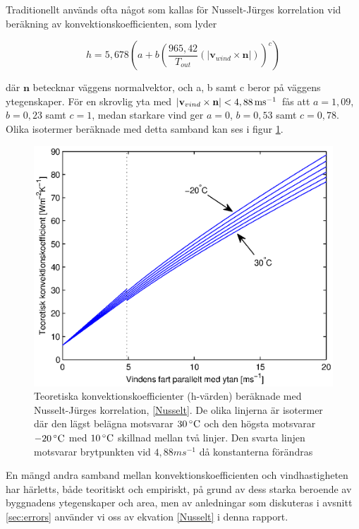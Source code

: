 Traditionellt används ofta något som kallas för Nusselt-Jürges korrelation vid beräkning av konvektionskoefficienten, som lyder

\begin{equation}\label{Nusselt}
h = 5,678 \left( a + b \left( \frac{965,42}{T_{out}}\left(|\mathbf{v}_{wind}\times \mathbf{n}|\right) \right)^c \right)
\end{equation}

där $\mathbf{n}$ betecknar väggens normalvektor, och a, b samt c beror på väggens ytegenskaper. För en skrovlig yta med $|\mathbf{v}_{vind}\times \mathbf{n}| < \unit[4,88]{ms^{-1}}$ fås att $a=1,09$, $b=0,23$ samt $c=1$, medan starkare vind ger $a=0$, $b=0,53$ samt $c=0,78$. Olika isotermer beräknade med detta samband kan ses i figur \ref{hvalues}.

\begin{figure}[hpbt]\centering
\includegraphics[scale=0.7]{images/hvalues.eps}
\caption{Teoretiska konvektionskoefficienter (h-värden) beräknade med Nusselt-Jürges korrelation, \eqref{Nusselt}. De olika linjerna är isotermer där den lägst belägna motsvarar $\unit[30]{^{\circ}C}$ och den högsta motsvarar $\unit[-20]{^{\circ}C}$ med $\unit[10]{^{\circ}C}$ skillnad mellan två linjer. Den svarta linjen motsvarar brytpunkten vid $\unit{4,88}{m s^{-1}}$ då konstanterna förändras}
\label{hvalues}
\end{figure}

En mängd andra samband mellan konvektionskoefficienten och vindhastigheten har härletts, både teoritiskt och empiriskt, på grund av dess starka beroende av byggnadens ytegenskaper och area, men av anledningar som diskuteras i avsnitt \ref{sec:errors} använder vi oss av ekvation \ref{Nusselt} i denna rapport.\cite{palyvos08}

